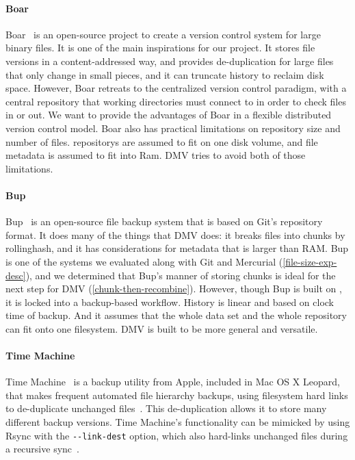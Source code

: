 \paragraph{Boar}

Boar~\cite{boar_homepage} is an open-source project to create a version control system for large binary files.
It is one of the main inspirations for our project.
It stores file versions in a content-addressed way, and provides de-duplication for large files that only change in small pieces, and it can truncate history to reclaim disk space.
However, Boar retreats to the centralized version control paradigm, with a central \gls{repository} that working directories must connect to in order to check files in or out.
We want to provide the advantages of Boar in a flexible distributed version control model.
Boar also has practical limitations on \gls{repository} size and number of files.
\glspl{repository} are assumed to fit on one disk volume, and file metadata is assumed to fit into Ram.
\gls{DMV} tries to avoid both of those limitations.


\paragraph{Bup}\label{related_bup}

Bup~\cite{bup_homepage} is an open-source file backup system that is based on Git's \gls{repository} format.
It does many of the things that \gls{DMV} does: it breaks files into chunks by \gls{rollinghash}, and it has considerations for metadata that is larger than RAM.
Bup is one of the systems we evaluated along with Git and Mercurial (\autoref{file-size-exp-desc}), and we determined that Bup's manner of storing chunks is ideal for the next step for \gls{DMV} (\autoref{chunk-then-recombine}).
However, though Bup is built on , it is locked into a backup-based workflow.
History is linear and based on clock time of backup.
And it assumes that the whole data set and the whole \gls{repository} can fit onto one filesystem.
\gls{DMV} is built to be more general and versatile.


\paragraph{Time Machine}

Time Machine~\cite{timemachine_patent} is a backup utility from Apple, included in Mac OS X Leopard, that makes frequent automated file hierarchy backups, using filesystem hard links to de-duplicate unchanged files~\cite{timemachine_magic}. This de-duplication allows it to store many different backup versions. Time Machine's functionality can be mimicked by using Rsync with the \lstinline{--link-dest} option, which also hard-links unchanged files during a recursive sync~\cite{timemachine_foreveryunix}.
